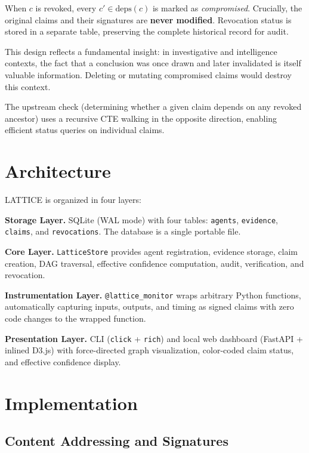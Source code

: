\documentclass[11pt,twocolumn]{article}
\begin{document}
\noindent When $c$ is revoked, every $c' \in \text{deps}(c)$ is marked as \textit{compromised}. Crucially, the original claims and their signatures are \textbf{never modified}. Revocation status is stored in a separate table, preserving the complete historical record for audit.

This design reflects a fundamental insight: in investigative and intelligence contexts, the fact that a conclusion was once drawn and later invalidated is itself valuable information. Deleting or mutating compromised claims would destroy this context.

The upstream check (determining whether a given claim depends on any revoked ancestor) uses a recursive CTE walking in the opposite direction, enabling efficient status queries on individual claims.

\section{Architecture}
\label{sec:architecture}

LATTICE is organized in four layers:

\textbf{Storage Layer.} SQLite (WAL mode) with four tables: \texttt{agents}, \texttt{evidence}, \texttt{claims}, and \texttt{revocations}. The database is a single portable file.

\textbf{Core Layer.} \texttt{LatticeStore} provides agent registration, evidence storage, claim creation, DAG traversal, effective confidence computation, audit, verification, and revocation.

\textbf{Instrumentation Layer.} \texttt{@lattice\_monitor} wraps arbitrary Python functions, automatically capturing inputs, outputs, and timing as signed claims with zero code changes to the wrapped function.

\textbf{Presentation Layer.} CLI (\texttt{click} + \texttt{rich}) and local web dashboard (FastAPI + inlined D3.js) with force-directed graph visualization, color-coded claim status, and effective confidence display.

\section{Implementation}
\label{sec:implementation}

\subsection{Content Addressing and Signatures}
\end{document}
